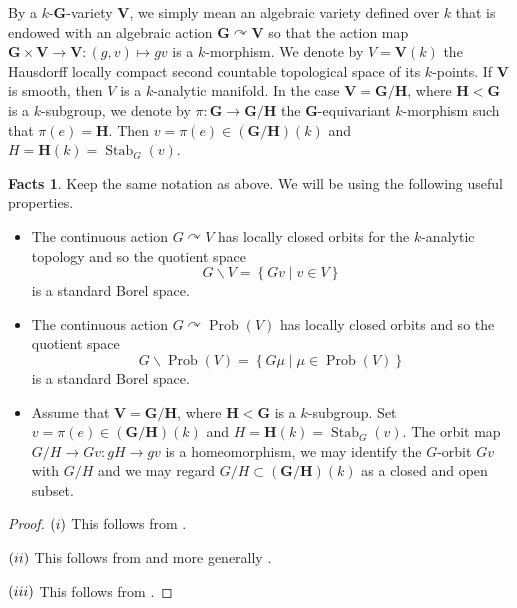 \documentclass[11pt]{amsart}
\numberwithin{equation}{section}
\theoremstyle{plain}
\theoremstyle{definition}
\newtheorem{facts}[thm]{Facts}
\newcommand{\Stab}{\operatorname{Stab}}
\newcommand{\Prob}{\operatorname{Prob}}
\begin{document}
By a $k$-$\mathbf G$-variety $\mathbf V$, we simply mean an algebraic variety defined over $k$ that is endowed with an algebraic action $\mathbf G \curvearrowright \mathbf V$ so that the action map $\mathbf G \times \mathbf V \to \mathbf V : (g, v) \mapsto gv$ is a $k$-morphism. We denote by $V = \mathbf V(k)$ the Hausdorff locally compact second countable topological space of its $k$-points. If $\mathbf V$ is smooth, then $V$ is a $k$-analytic manifold. In the case $\mathbf V = \mathbf G/\mathbf H$, where $\mathbf H < \mathbf G$ is a $k$-subgroup, we denote by $\pi : \mathbf G \to \mathbf G/\mathbf H$ the $\mathbf G$-equivariant $k$-morphism such that $\pi(e) = \mathbf H$. Then  $v = \pi(e) \in (\mathbf G/\mathbf H)(k)$ and $H = \mathbf H(k) = \Stab_G(v)$.

\begin{facts}\label{fact-algebraic}
Keep the same notation as above. We will be using the following useful properties. 
\begin{itemize}
\item [$(\rm i)$] The continuous action $G \curvearrowright V$ has locally closed orbits for the $k$-analytic topology and so the quotient space $$G\backslash V = \left \{ Gv \mid v \in V\right \}$$ is a standard Borel space. 

\item [$(\rm ii)$] The continuous action $G \curvearrowright \Prob(V)$ has locally closed orbits and so the quotient space $$G\backslash \Prob(V) = \left \{ G\mu \mid \mu \in \Prob(V)\right \}$$ is a standard Borel space. 

\item [$(\rm iii)$] Assume that $\mathbf V = \mathbf G/\mathbf H$, where $\mathbf H < \mathbf G$ is a $k$-subgroup. Set $v = \pi(e) \in (\mathbf G/\mathbf H)(k)$ and $H = \mathbf H(k) = \Stab_G(v)$. The orbit map $G/H \to Gv : gH \to gv$ is a homeomorphism, we may identify the $G$-orbit $Gv$ with $G/H$ and we may regard $G/H \subset (\mathbf G/\mathbf H)(k)$ as a closed and open subset. 
\end{itemize}
\end{facts}

\begin{proof}
$(\rm i)$ This follows from \cite[Theorem 2.1.14, Proposition 3.1.3]{Zi84}.

$(\rm ii)$ This follows from \cite[Theorem 2.1.14, Proposition 3.2.6]{Zi84} and more generally \cite[Theorem 1.7]{BDL14}.

$(\rm iii)$  This follows from \cite[Proposition I.2.1.4]{Ma91}.
\end{proof}
\end{document}
